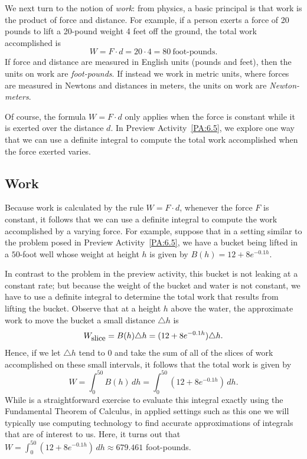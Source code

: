 We next turn to the notion of \emph{work}:  from physics, a basic principal is that work is the product of force and distance.  For example, if a person exerts a force of 20 pounds to lift a 20-pound weight 4 feet off the ground, the total work accomplished is
$$W = F \cdot d = 20 \cdot 4 = 80 \ \mbox{foot-pounds}.$$
If force and distance are measured in English units (pounds and feet), then the units on work are \emph{foot-pounds}.  If instead we work in metric units, where forces are measured in Newtons and distances in meters, the units on work are \emph{Newton-meters}.

Of course, the formula $W = F \cdot d$ only applies when the force  is constant while it is exerted over the distance $d$.  In Preview Activity~\ref{PA:6.5}, we explore one way that we can use a definite integral to compute the total work accomplished when the force exerted varies.


\subsection*{Work} 

Because work is calculated by the rule $W = F \cdot d$, whenever the force $F$ is constant, it follows that we can use a definite integral to compute the work accomplished by a varying force.  For example, suppose that in a setting similar to the problem posed in Preview Activity~\ref{PA:6.5}, we have a bucket being lifted in a $50$-foot well whose weight at height $h$ is given by $B(h) = 12 + 8e^{-0.1h}$.  

In contrast to the problem in the preview activity, this bucket is not leaking at a constant rate; but because the weight of the bucket and water is not constant, we have to use a definite integral to determine the total work that results from lifting the bucket.  Observe that at a height $h$ above the water, the approximate work to move the bucket a small distance $\triangle h$ is
$$W_{\mbox{\small{slice}}} = B(h) \triangle h = (12 + 8e^{-0.1h}) \triangle h.$$
Hence, if we let $\triangle h$ tend to $0$ and take the sum of all of the slices of work accomplished on these small intervals, it follows that the total work is given by
$$W = \int_0^{50} B(h) \, dh = \int_0^{50} (12 + 8e^{-0.1h}) \, dh.$$
While is a straightforward exercise to evaluate this integral exactly using the Fundamental Theorem of Calculus, in applied settings such as this one we will typically use computing technology to find accurate approximations of integrals that are of interest to us.  Here, it turns out that $W = \int_0^{50} (12 + 8e^{-0.1h}) \, dh \approx 679.461$ foot-pounds.

